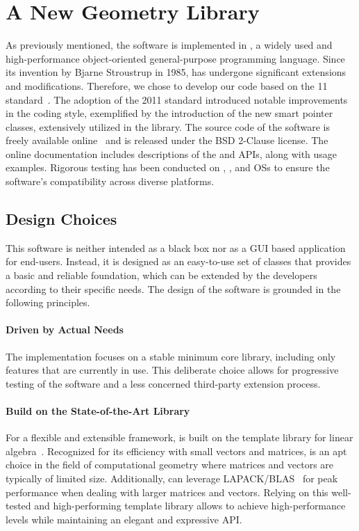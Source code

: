 \section{A New Geometry Library}

As previously mentioned, the software is implemented in \cpp{}, a widely used and high-performance object-oriented general-purpose programming language. Since its invention by Bjarne Stroustrup in 1985, \cpp{} has undergone significant extensions and modifications. Therefore, we chose to develop our code based on the \cpp{}11 standard~\cite{stroustrup2013cpp}. The adoption of the 2011 standard introduced notable improvements in the coding style, exemplified by the introduction of the new smart pointer classes, extensively utilized in the \Acme{} library. The source code of the software is freely available online~\cite{acme} and is released under the \ac{BSD} 2-Clause license. The online documentation includes descriptions of the \cpp{} and \Matlab{} \Mex{} \acp{API}, along with usage examples. Rigorous testing has been conducted on \MacOS{}, \Linux{}, and \Windows{} \acp{OS} to ensure the software's compatibility across diverse platforms.

\subsection{Design Choices}

This software is neither intended as a black box nor as a \ac{GUI} based application for end-users. Instead, it is designed as an easy-to-use set of \cpp{} classes that provides a basic and reliable foundation, which can be extended by the developers according to their specific needs. The design of the software is grounded in the following principles.

\paragraph{Driven by Actual Needs}
The implementation focuses on a stable minimum core library, including only features that are currently in use. This deliberate choice allows for progressive testing of the software and a less concerned third-party extension process.

\paragraph{Build on the State-of-the-Art \Eigen{} Library}
For a flexible and extensible framework, \Acme{} is built on the \Eigen{} template library for linear algebra~\cite{eigen2010eigen}. Recognized for its efficiency with small vectors and matrices, \Eigen{} is an apt choice in the field of computational geometry where matrices and vectors are typically of limited size. Additionally, \Eigen{} can leverage \ac{LAPACK}/\ac{BLAS}~\cite{anderson1999lapack} for peak performance when dealing with larger matrices and vectors. Relying on this well-tested and high-performing template library allows \Acme{} to achieve high-performance levels while maintaining an elegant and expressive \ac{API}.

